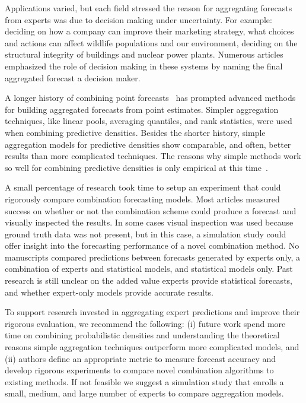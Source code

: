 \documentclass[preprint]{elsarticle}
\begin{document}
Applications varied, but each field stressed the reason for aggregating forecasts from experts was due to decision making under uncertainty. 
For example: deciding on how a company can improve their marketing strategy, what choices and actions can affect wildlife populations and our environment, deciding on the structural integrity of buildings and nuclear power plants.
Numerous articles emphasized the role of decision making in these systems by naming the final aggregated forecast a decision maker.

A longer history of combining point forecasts~\cite{galton1907vox,bates1969combination,granger1984improved} has prompted advanced methods for building aggregated forecasts from point estimates. 
Simpler aggregation techniques, like linear pools, averaging quantiles, and rank statistics, were used when combining predictive densities.
Besides the shorter history, simple aggregation models for predictive densities show comparable, and often, better results than more complicated techniques.
The reasons why simple methods work so well for combining predictive densities is only empirical at this time~\cite{makridakis1983averages,clemen1989combining}.

A small percentage of research took time to setup an experiment that could rigorously compare combination forecasting models.
Most articles measured success on whether or not the combination scheme could produce a forecast and visually inspected the results.
In some cases visual inspection was used because ground truth data was not present, but in this case, a simulation study could offer insight into the forecasting performance of a novel combination method.
No manuscripts compared predictions between forecasts generated by experts only, a combination of experts and statistical models, and statistical models only.
Past research is still unclear on the added value experts provide statistical forecasts, and whether expert-only models provide accurate results.

To support research invested in aggregating expert predictions and improve their rigorous evaluation, we recommend the following: (i) future work spend more time on combining probabilistic densities and understanding the theoretical reasons simple aggregation techniques outperform more complicated models, and (ii) authors define an appropriate metric to measure forecast accuracy and develop rigorous experiments to compare novel combination algorithms to existing methods.
If not feasible we suggest a simulation study that enrolls a small, medium, and large number of experts to compare aggregation models.
\end{document}
